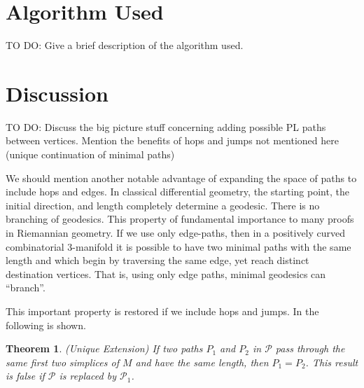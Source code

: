 \documentclass[12pt]{article}
\newtheorem{thm}{Theorem}[section]
\begin{document}
\section{Algorithm Used}

TO DO: Give a brief description of the algorithm used.

\section{Discussion}

TO DO: Discuss the big picture stuff concerning adding possible PL paths between vertices. Mention the benefits of hops and jumps not mentioned here (unique continuation of minimal paths) 

We should mention another notable advantage of expanding the space of paths to include hops and edges. In classical differential geometry, the starting point, the initial direction, and length completely determine a geodesic. There is no branching of geodesics. This property of fundamental importance to many proofs in Riemannian geometry. If we use only edge-paths, then in a positively curved combinatorial 3-manifold it is possible to have two minimal paths with the same length and which begin by traversing the same edge, yet reach distinct destination vertices. That is, using only edge paths, minimal geodesics can ``branch''.

This important property is restored if we include hops and jumps. In \cite{Trout10} the following is shown.

\begin{thm}(Unique Extension) If two paths $P_1$ and $P_2$ in $\mathcal{P}$ pass through the same first two simplices of $M$ and have the same length, then $P_1 = P_2$. This result is false if $\mathcal{P}$ is replaced by $\mathcal{P}_1$.
\end{thm}



\end{document}
